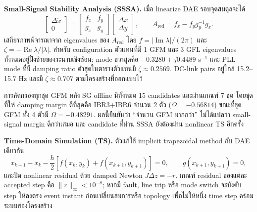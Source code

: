 \documentclass[12pt,a4paper]{article}
\begin{document}
\noindent\textbf{Small-Signal Stability Analysis (SSSA).} เมื่อ linearize DAE รอบจุดสมดุลจะได้
\begin{equation}
\begin{bmatrix}\Delta\dot{x}\\0\end{bmatrix}=
\begin{bmatrix}f_x&f_y\\g_x&g_y\end{bmatrix}
\begin{bmatrix}\Delta x\\\Delta y\end{bmatrix},\qquad
A_{\mathrm{red}}=f_x-f_y g_y^{-1}g_x.
\end{equation}
เสถียรภาพพิจารณาจาก eigenvalues ของ $A_{\mathrm{red}}$ โดย $f=|\operatorname{Im}\lambda|/(2\pi)$ และ $\zeta=-\operatorname{Re}\lambda/|\lambda|$. สำหรับ configuration ตัวแทนที่มี 1 GFM และ 3 GFL eigenvalues ทั้งหมดอยู่ฝั่งซ้ายของระนาบเชิงซ้อน; mode ขวาสุดคือ $-0.3280\pm j0.4489$ s$^{-1}$ และ PLL mode ที่มี damping ratio ต่ำสุดในตารางตัวแทนมี $\zeta\approx0.2569$. DC-link pairs อยู่ใกล้ 15.2--15.7 Hz และมี $\zeta\approx0.707$ ตามโครงสร้างที่ออกแบบไว้

การคัดกรองทุกชุด GFM หลัง SG offline มีทั้งหมด 15 candidates และผ่านเกณฑ์ 7 ชุด โดยชุดที่ให้ damping margin ดีที่สุดคือ IBR3+IBR6 จำนวน 2 ตัว ($\Omega=-0.56814$) ขณะที่ชุด GFM ทั้ง 4 ตัวมี $\Omega=-0.48291$. ผลนี้ยืนยันว่า ``จำนวน GFM มากกว่า'' ไม่ได้แปลว่า small-signal margin ดีกว่าเสมอ และ candidate ที่ผ่าน SSSA ยังต้องผ่าน nonlinear TS อีกครั้ง

\noindent\textbf{Time-Domain Simulation (TS).} ตัวแก้ใช้ implicit trapezoidal method กับ DAE เดียวกัน
\begin{equation}
x_{k+1}-x_k-\frac{h}{2}\left[f(x_k,y_k)+f(x_{k+1},y_{k+1})\right]=0,
\qquad g(x_{k+1},y_{k+1})=0,
\end{equation}
และปิด nonlinear residual ด้วย damped Newton $J\Delta z=-r$. เกณฑ์ residual ของแต่ละ accepted step คือ $\|r\|_{\infty}<10^{-8}$; หากมี fault, line trip หรือ mode switch จะบังคับ step ให้ลงตรง event instant ก่อนเปลี่ยนสมการหรือ topology เพื่อไม่ให้หนึ่ง time step คร่อมระบบสองโครงสร้าง
\end{document}
